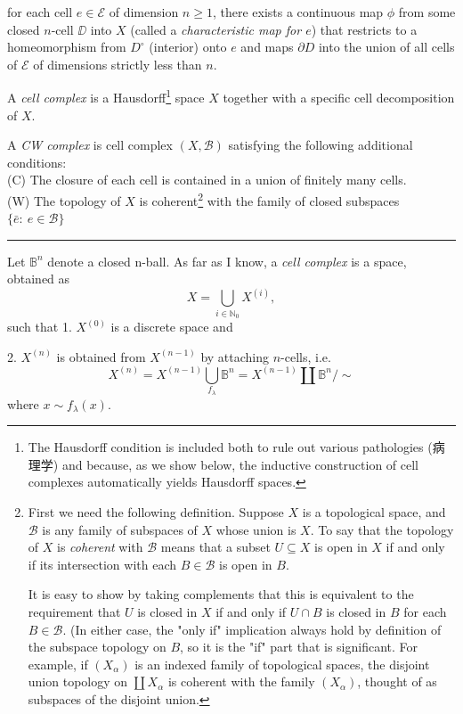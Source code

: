    for each cell $e\in \mathcal{E}$ of dimension $n\geq 1$, there exists a continuous map $\phi$
   from some closed $n$-cell $\DD$ into $X$ (called a {\it characteristic map for $e$}) that restricts to a homeomorphism from $D^{\circ}$ (interior) onto $e$ and maps $\partial D$ into the union of all cells of $\mathcal{E}$ of dimensions strictly less than $n$.\par
   A {\it cell complex} is a Hausdorff\footnote{The Hausdorff condition is included both to rule out various pathologies (病理学) and because, as we show below, the inductive construction of cell complexes automatically yields Hausdorff spaces.} space $X$ together with a specific cell decomposition of $X$.\par
   A {\it CW complex} is cell complex $(X,\mathcal{B})$ satisfying the following additional conditions:\\
   (C) The closure of each cell is contained in a union of finitely many cells.\\
   (W) The topology of $X$ is coherent\footnote{First we need the following definition. Suppose $X$ is a topological space, and $\mathcal{B}$ is any family of subspaces of $X$ whose union is $X$. To say that the topology of $X$ is {\it coherent} with $\mathcal{B}$ means that a subset $U\subseteq X$ is open in $X$ if and only if its intersection with each $B\in \mathcal{B}$ is open in $B$.\par 
   It is easy to show by taking complements that this is equivalent to the requirement that $U$ is closed in $X$ if and only if $U\cap B$ is closed in $B$ for each $B \in\mathcal{B}$. (In either case, the "only if" implication always hold by definition of the subspace topology on $B$, so it is the "if" part that is significant. For example, if $(X_{\alpha})$ is an indexed family of topological spaces, the disjoint union topology on $\coprod X_{\alpha}$ is coherent with the family $(X_{\alpha})$, thought of as subspaces of the disjoint union.} with the family of closed subspaces $\{\bar{e}:\ e\in \mathcal{B}\}$ \par
\vspace{3pt}
\hrule
\vspace{3pt}
Let $\mathbb{B}^n$ denote a closed n-ball. As far as I know, a {\it cell complex} is a space, obtained as \[X=\bigcup_{i\in\mathbb{N}_0} X^{(i)},\] 
such that
1. $X^{(0)}$ is a discrete space and

2. $X^{(n)}$ is obtained from $X^{(n-1)}$ by attaching $n$-cells, i.e.
\[X^{(n)}= X^{(n-1)}\bigcup_{f_{\lambda}}\mathbb{B}^n= X^{(n-1)}\coprod \mathbb{B}^n/\sim\]
where $x\sim f_\lambda(x)$.

